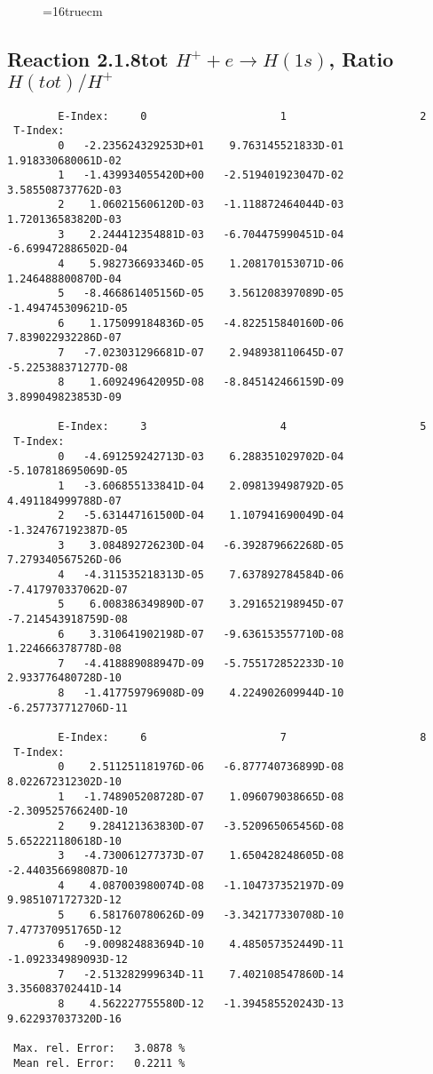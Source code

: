 \documentclass[12pt,dvipdfmx]{article}
\begin{document}
\begin{figure} \label{2.1.8re}
\epsfxsize=16truecm
\end{figure}
\newpage


\subsection{
Reaction 2.1.8tot  $H^+ + e \rightarrow H(1s) $, Ratio $H(tot)/H^+$
}

\begin{small}\begin{verbatim}
        E-Index:     0                     1                     2
 T-Index:
        0   -2.235624329253D+01    9.763145521833D-01    1.918330680061D-02
        1   -1.439934055420D+00   -2.519401923047D-02    3.585508737762D-03
        2    1.060215606120D-03   -1.118872464044D-03    1.720136583820D-03
        3    2.244412354881D-03   -6.704475990451D-04   -6.699472886502D-04
        4    5.982736693346D-05    1.208170153071D-06    1.246488800870D-04
        5   -8.466861405156D-05    3.561208397089D-05   -1.494745309621D-05
        6    1.175099184836D-05   -4.822515840160D-06    7.839022932286D-07
        7   -7.023031296681D-07    2.948938110645D-07   -5.225388371277D-08
        8    1.609249642095D-08   -8.845142466159D-09    3.899049823853D-09

        E-Index:     3                     4                     5
 T-Index:
        0   -4.691259242713D-03    6.288351029702D-04   -5.107818695069D-05
        1   -3.606855133841D-04    2.098139498792D-05    4.491184999788D-07
        2   -5.631447161500D-04    1.107941690049D-04   -1.324767192387D-05
        3    3.084892726230D-04   -6.392879662268D-05    7.279340567526D-06
        4   -4.311535218313D-05    7.637892784584D-06   -7.417970337062D-07
        5    6.008386349890D-07    3.291652198945D-07   -7.214543918759D-08
        6    3.310641902198D-07   -9.636153557710D-08    1.224666378778D-08
        7   -4.418889088947D-09   -5.755172852233D-10    2.933776480728D-10
        8   -1.417759796908D-09    4.224902609944D-10   -6.257737712706D-11

        E-Index:     6                     7                     8
 T-Index:
        0    2.511251181976D-06   -6.877740736899D-08    8.022672312302D-10
        1   -1.748905208728D-07    1.096079038665D-08   -2.309525766240D-10
        2    9.284121363830D-07   -3.520965065456D-08    5.652221180618D-10
        3   -4.730061277373D-07    1.650428248605D-08   -2.440356698087D-10
        4    4.087003980074D-08   -1.104737352197D-09    9.985107172732D-12
        5    6.581760780626D-09   -3.342177330708D-10    7.477370951765D-12
        6   -9.009824883694D-10    4.485057352449D-11   -1.092334989093D-12
        7   -2.513282999634D-11    7.402108547860D-14    3.356083702441D-14
        8    4.562227755580D-12   -1.394585520243D-13    9.622937037320D-16

 Max. rel. Error:   3.0878 %
 Mean rel. Error:   0.2211 %

\end{verbatim}\end{small}
\end{document}
